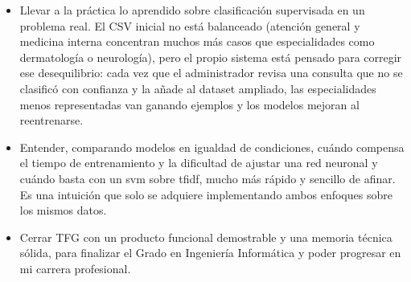 \begin{itemize}
	\item Llevar a la práctica lo aprendido sobre clasificación supervisada en un problema real. El CSV inicial no está balanceado (atención general y medicina interna concentran muchos más casos que especialidades como dermatología o neurología), pero el propio sistema está pensado para corregir ese desequilibrio: cada vez que el administrador revisa una consulta que no se clasificó con confianza y la añade al dataset ampliado, las especialidades menos representadas van ganando ejemplos y los modelos mejoran al reentrenarse.
	\item Entender, comparando modelos en igualdad de condiciones, cuándo compensa el tiempo de entrenamiento y la dificultad de ajustar una red neuronal y cuándo basta con un \gls{svm} sobre \gls{tfidf}, mucho más rápido y sencillo de afinar. Es una intuición que solo se adquiere implementando ambos enfoques sobre los mismos datos.
	\item Cerrar TFG con un producto funcional demostrable y una memoria técnica sólida, para finalizar el Grado en Ingeniería Informática y poder progresar en mi carrera profesional.
\end{itemize}